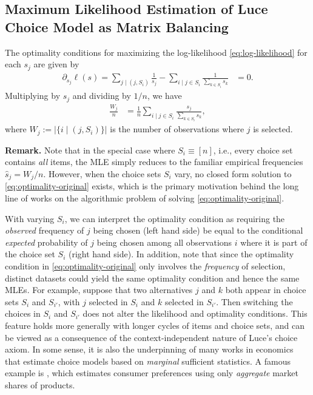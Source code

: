 \subsection{Maximum Likelihood Estimation of Luce Choice Model as Matrix Balancing}
\label{subsec:reformulation}
The optimality conditions for maximizing the log-likelihood \eqref{eq:log-likelihood} for each $s_j$ are given by
\begin{align*}
\partial_{s_{j}}\ell(s)=\sum_{j\mid (j,S_i)}\frac{1}{s_{j}}-\sum_{i\mid j\in S_{i}}\frac{1}{\sum_{k\in S_{i}}s_{k}} & =0.
\end{align*}
 Multiplying by $s_{j}$ and dividing by $1/n$, we have 
\begin{align}
\label{eq:optimality-original}
\frac{W_j}{n} & = \frac{1}{n} \sum_{i\mid j\in S_{i}}\frac{s_{j}}{\sum_{k\in S_{i}}s_{k}},
\end{align}
where $W_j:=|\{i\mid (j,S_i)\}|$ is the number of observations where $j$ is selected.

\textbf{Remark.} Note that in the special case where $S_i\equiv [n]$, i.e., every choice set contains \emph{all} items, the MLE simply reduces to the familiar empirical frequencies $\hat s_j = {W_j}/{n}$. However, when the choice sets $S_i$ vary, no closed form solution to \eqref{eq:optimality-original} exists, which is the primary motivation behind the long line of works on the algorithmic problem of solving \eqref{eq:optimality-original}. 

With varying $S_i$, we can interpret the optimality condition as requiring the \emph{observed} frequency of $j$ being chosen (left hand side) be equal to the conditional \emph{expected} probability of $j$ being chosen among all observations $i$ where it is part of the choice set $S_i$ (right hand side). In addition, note that since the optimality condition in \eqref{eq:optimality-original} only involves the \emph{frequency} of selection, distinct datasets could yield the same optimality condition and hence the same MLEs. For example, suppose that two alternatives $j$ and $k$ both appear in choice sets
$S_{i}$ and $S_{i'}$, with $j$ selected in $S_{i}$ and  $k$ selected in $S_{i'}$. Then switching
the choices in $S_{i}$ and $S_{i'}$ does not alter the likelihood and optimality conditions. This feature holds more generally with longer cycles of items and choice sets, and can be viewed as a consequence of the context-independent nature of Luce's choice axiom. In some sense, it is also the underpinning of many works in economics that estimate choice models based on \emph{marginal} sufficient statistics. A famous example is  \citet{berry1995automobile}, which estimates consumer preferences using only \emph{aggregate} market shares of products.

